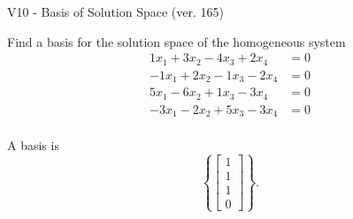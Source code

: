 \begin{exercise}
  \begin{exerciseTitle}V10 - Basis of Solution Space (ver. 165)\end{exerciseTitle}
  \begin{exerciseStatement}
    Find a basis for the solution space of the homogeneous system 
\begin{align*}
 1 x_ 1 + 3 x_ 2 -4 x_ 3 + 2 x_ 4 &= 0  \\ 
  -1 x_ 1 + 2 x_ 2 -1 x_ 3 -2 x_ 4 &= 0  \\ 
  5 x_ 1 -6 x_ 2 + 1 x_ 3 -3 x_ 4 &= 0  \\ 
  -3 x_ 1 -2 x_ 2 + 5 x_ 3 -3 x_ 4 &= 0  \\ 
 \end{align*}


 
  \end{exerciseStatement}

  \begin{exerciseAnswer}
   A basis is   
\[\left\{\left[\begin{array}{c}
1 \\
1 \\
1 \\
0
\end{array}\right]\right\}.\]

  


  \end{exerciseAnswer}
\end{exercise}
